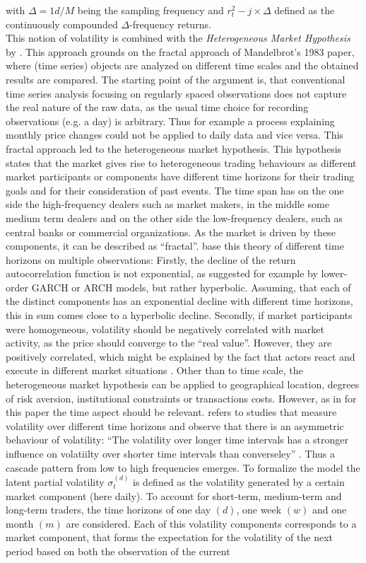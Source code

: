 with $\Delta = 1d/M$ being the sampling frequency and $r^{2}_t-j \times \Delta$ defined as the continuously compounded $\Delta$-frequency returns. \\
This notion of volatility is combined with the \emph{Heterogeneous Market Hypothesis} by \textcite{mueller1993}. This approach grounds on the fractal approach of Mandelbrot's 1983 paper, where (time series) objects are analyzed on different time scales and the obtained results are compared. The starting point of the argument is, that conventional time series analysis focusing on regularly spaced observations does not capture the real nature of the raw data, as the usual time choice for recording observations (e.g. a day) is arbitrary. Thus for example a process explaining monthly price changes could not be applied to daily data and vice versa. This fractal approach led to the heterogeneous market hypothesis. This hypothesis states that the market gives rise to heterogeneous trading behaviours as different market participants or components have different time horizons for their trading goals and for their consideration of past events. The time span has on the one side the high-frequency dealers such as market makers, in the middle some medium term dealers and on the other side the low-frequency dealers, such as central banks or commercial organizations. As the market is driven by these components, it can be described as ``fractal''. \textcite{mueller1993} base this theory of different time horizons on multiple observations: Firstly, the decline of the return autocorrelation function is not exponential, as suggested for example by lower-order GARCH or ARCH models, but rather hyperbolic. Assuming, that each of the distinct components has an exponential decline with different time horizons, this in sum comes close to a hyperbolic decline. Secondly, if market participants were homogeneous, volatility should be negatively correlated with market activity, as the price should converge to the ``real value''. However, they are positively correlated, which might be explained by the fact that actors react and execute in different market situations \parencite{mueller1993}. Other than to time scale, the heterogeneous market hypothesis can be applied to geographical location, degrees of risk aversion, institutional constraints or transactions costs. However, as in \textcite{corsi2009} for this paper the time aspect should be relevant. \textcite{corsi2009} refers to studies that measure volatility over different time horizons and observe that there is an asymmetric behaviour of volatility: ``The volatility over longer time intervals has a stronger influence on volatiilty over shorter time intervals than converseley'' \parencite[p.178]{corsi2009}. Thus a cascade pattern from low to high frequencies emerges. To formalize the model the latent partial volatility $\sigma_{t}^{(d)}$ is defined as the volatility generated by a certain market component (here daily). To account for short-term, medium-term and long-term traders, the time horizons of one day $(d)$, one week $(w)$ and one month $(m)$ are considered. Each of this volatility components corresponds to a market component, that forms the expectation for the volatility of the next period based on both the observation of the current 